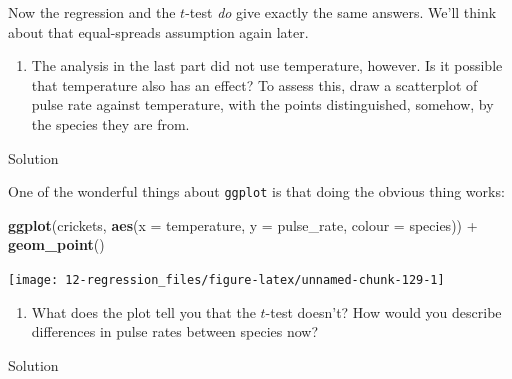 \documentclass[]{tufte-book}
\newenvironment{Shaded}{}{}
\newcommand{\DataTypeTok}[1]{\textcolor[rgb]{0.56,0.13,0.00}{#1}}
\newcommand{\KeywordTok}[1]{\textcolor[rgb]{0.00,0.44,0.13}{\textbf{#1}}}
\newcommand{\NormalTok}[1]{#1}
\newcommand{\OperatorTok}[1]{\textcolor[rgb]{0.40,0.40,0.40}{#1}}
\newcommand{\StringTok}[1]{\textcolor[rgb]{0.25,0.44,0.63}{#1}}
\providecommand{\tightlist}{%
  \setlength{\itemsep}{0pt}\setlength{\parskip}{0pt}}
\theoremstyle{definition}
\theoremstyle{definition}
\theoremstyle{definition}
\theoremstyle{remark}
\begin{document}
Now the regression and the \(t\)-test \emph{do} give exactly the same
answers. We'll think about that equal-spreads assumption again later.

\begin{enumerate}
\def\labelenumi{(\alph{enumi})}
\setcounter{enumi}{3}
\tightlist
\item
  The analysis in the last part did not use temperature, however. Is it
  possible that temperature also has an effect? To assess this, draw a
  scatterplot of pulse rate against temperature, with the points
  distinguished, somehow, by the species they are from.
\end{enumerate}

Solution

One of the wonderful things about \texttt{ggplot} is that doing the
obvious thing works:

\begin{Shaded}
\begin{Highlighting}[]
\KeywordTok{ggplot}\NormalTok{(crickets, }\KeywordTok{aes}\NormalTok{(}\DataTypeTok{x =}\NormalTok{ temperature, }\DataTypeTok{y =}\NormalTok{ pulse_rate, }
    \DataTypeTok{colour =}\NormalTok{ species)) }\OperatorTok{+}\StringTok{ }\KeywordTok{geom_point}\NormalTok{()}
\end{Highlighting}
\end{Shaded}

\texttt{[image: 12-regression\_files/figure-latex/unnamed-chunk-129-1]}

\begin{enumerate}
\def\labelenumi{(\alph{enumi})}
\setcounter{enumi}{4}
\tightlist
\item
  What does the plot tell you that the \(t\)-test doesn't? How would you
  describe differences in pulse rates between species now?
\end{enumerate}

Solution
\end{document}
